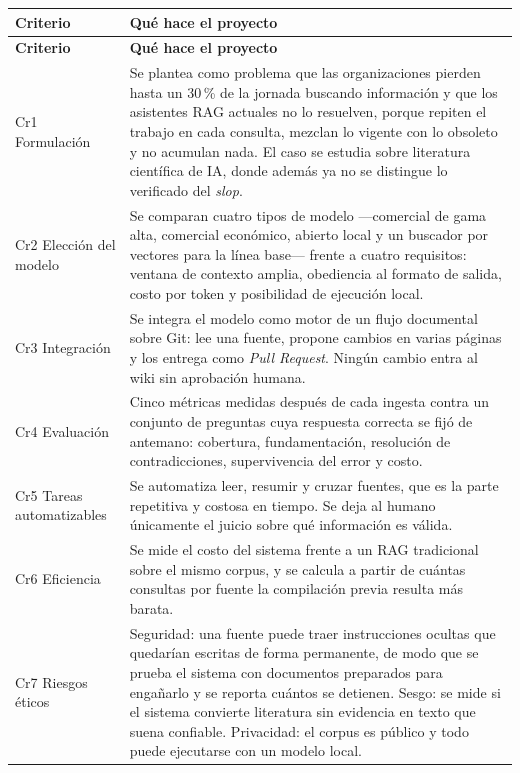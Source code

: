 \documentclass[11pt,letterpaper]{article}
\begin{document}
\small
\begin{longtable}{L{2.9cm} L{11.4cm}}
\toprule
\textbf{Criterio} & \textbf{Qué hace el proyecto} \\
\midrule
\endfirsthead
\toprule
\textbf{Criterio} & \textbf{Qué hace el proyecto} \\
\midrule
\endhead
\bottomrule
\endfoot
Cr1 Formulación & Se plantea como problema que las organizaciones pierden hasta un 30\,\% de la jornada buscando información y que los asistentes RAG actuales no lo resuelven, porque repiten el trabajo en cada consulta, mezclan lo vigente con lo obsoleto y no acumulan nada. El caso se estudia sobre literatura científica de IA, donde además ya no se distingue lo verificado del \textit{slop}. \\
Cr2 Elección del modelo & Se comparan cuatro tipos de modelo —comercial de gama alta, comercial económico, abierto local y un buscador por vectores para la línea base— frente a cuatro requisitos: ventana de contexto amplia, obediencia al formato de salida, costo por token y posibilidad de ejecución local. \\
Cr3 Integración & Se integra el modelo como motor de un flujo documental sobre Git: lee una fuente, propone cambios en varias páginas y los entrega como \textit{Pull Request}. Ningún cambio entra al wiki sin aprobación humana. \\
Cr4 Evaluación & Cinco métricas medidas después de cada ingesta contra un conjunto de preguntas cuya respuesta correcta se fijó de antemano: cobertura, fundamentación, resolución de contradicciones, supervivencia del error y costo. \\
Cr5 Tareas automatizables & Se automatiza leer, resumir y cruzar fuentes, que es la parte repetitiva y costosa en tiempo. Se deja al humano únicamente el juicio sobre qué información es válida. \\
Cr6 Eficiencia & Se mide el costo del sistema frente a un RAG tradicional sobre el mismo corpus, y se calcula a partir de cuántas consultas por fuente la compilación previa resulta más barata. \\
Cr7 Riesgos éticos & Seguridad: una fuente puede traer instrucciones ocultas que quedarían escritas de forma permanente, de modo que se prueba el sistema con documentos preparados para engañarlo y se reporta cuántos se detienen. Sesgo: se mide si el sistema convierte literatura sin evidencia en texto que suena confiable. Privacidad: el corpus es público y todo puede ejecutarse con un modelo local. \\

\end{longtable}
\end{document}
